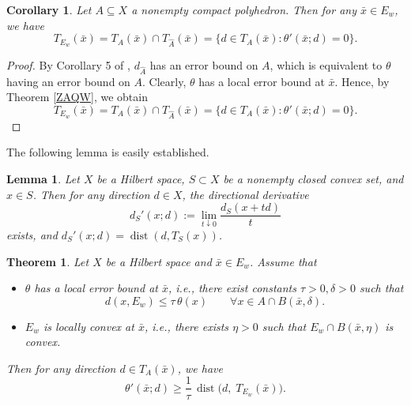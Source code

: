 \documentclass[11pt]{article}
\newtheorem{theorem}{Theorem}[section]
\newtheorem{corollary}{Corollary}[section]
\newtheorem{lemma}{Lemma}[section]
\begin{document}
\begin{corollary} Let   $A \subseteq X$ a  nonempty compact   polyhedron. 
	 Then	for any  $\bar{x} \in E_w$, we have
	\[
	T_{E_w}(\bar{x})=T_A(\bar{x})\cap T_{\widehat{A}}(\bar{x})=\{d\in T_A(\bar{x}):\theta'(\bar{x};d)=0\}.
	\]
\end{corollary}

\begin{proof}
	By Corollary 5  of  \cite{LiuNgYang2009}, $d_{\widehat{A}}$ has an error bound on $A$, which is equivalent to $\theta$ having an error bound on $A$. Clearly, $\theta$ has a local error bound at $\bar{x}$. Hence, by Theorem \ref{ZAQW}, we obtain
	\[
	T_{E_w}(\bar{x})=T_A(\bar{x})\cap T_{\widehat{A}}(\bar{x})=\{d\in T_A(\bar{x}):\theta'(\bar{x};d)=0\}.
	\]
\end{proof}


The following lemma is easily established.
\begin{lemma} \label{CYU}
	Let $X$ be a Hilbert space, $S\subset X$ be a nonempty closed convex set, and $x\in S$. Then for any direction $d\in X$, the directional derivative
	\[
	d_S'(x;d) := \lim_{t\downarrow0}\frac{d_S(x+td)}{t}
	\]
	exists, and
	$	d_S'(x;d) = \operatorname{dist}(d, T_S(x))$.
\end{lemma}

 

\begin{theorem} \label{TaqXEQ} 
	Let  $X$ be a Hilbert space  and $\bar x\in E_w$.  Assume that
	\begin{itemize}
		\item[(i)]  $\theta$ has a  local error bound at $\bar x$, i.e.,  there exist constants $\tau>0,\delta>0$ such that
	\begin{equation}\label{ECIA++}
		d(x,E_w)\le \tau\,\theta(x)\qquad \forall x\in A\cap B(\bar x,\delta).
		\end{equation}
		\item[(ii)]  $E_w$ is    locally convex  at $\bar x$, i.e., there exists $\eta >0$ such that $E_w\cap B(\bar x,\eta)$ is convex. 
	\end{itemize}
		Then for any   direction $d\in T_A(\bar x)$,   we have
	\[
	\theta'(\bar x;d)\ge \frac{1}{\tau}\,\operatorname{dist}\bigl(d,\;T_{E_w}(\bar x)\bigr).
	\]
\end{theorem}
\end{document}
